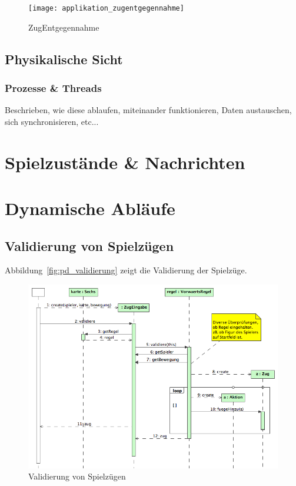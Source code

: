 \documentclass[12pt,halfparskip]{scrartcl}
\begin{document}
\begin{figure}[h]
	\centering
	\texttt{[image: applikation\_zugentgegennahme]}
	\caption{ZugEntgegennahme}
	\label{fig:applikation_zugentgegennahme}
\end{figure}


\clearpage
\subsection{Physikalische Sicht}

\subsubsection{Prozesse \& Threads} %
\label{sub:prozesse_threads}
Beschrieben, wie diese ablaufen, miteinander funktionieren, Daten austauschen, sich synchronisieren, etc...


\clearpage
\section{Spielzustände \& Nachrichten} %
\label{spielzustaende_nachrichten}

\clearpage
\section{Dynamische Abläufe} %
\label{dynamische_ablauefe}
\subsection{Validierung von Spielzügen} %
\label{ssub:validierung_von_spielzügen}
Abbildung~\vref{fig:pd_validierung} zeigt die Validierung der Spielzüge.
\begin{figure}[h]
	\centering
	\includegraphics[width=\textwidth]{pd_validierung}
	\caption{Validierung von Spielzügen}
	\label{fig:pd_validierung}
\end{figure}
\end{document}
